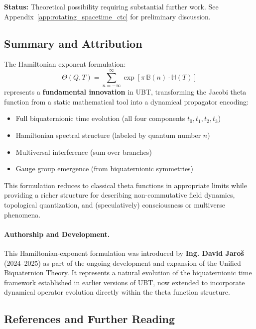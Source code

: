 \textbf{Status:} Theoretical possibility requiring substantial further work. See Appendix~\ref{app:rotating_spacetime_ctc} for preliminary discussion.

\subsection{Summary and Attribution}

The Hamiltonian exponent formulation:
\begin{equation}
\Theta(Q, T) = \sum_{n=-\infty}^{\infty} \exp\!\left[\pi\,\mathbb{B}(n) \cdot \mathbb{H}(T)\right]
\end{equation}
represents a \textbf{fundamental innovation} in UBT, transforming the Jacobi theta function from a static mathematical tool into a dynamical propagator encoding:
\begin{itemize}
\item Full biquaternionic time evolution (all four components $t_0, t_1, t_2, t_3$)
\item Hamiltonian spectral structure (labeled by quantum number $n$)
\item Multiversal interference (sum over branches)
\item Gauge group emergence (from biquaternionic symmetries)
\end{itemize}

This formulation reduces to classical theta functions in appropriate limits while providing a richer structure for describing non-commutative field dynamics, topological quantization, and (speculatively) consciousness or multiverse phenomena.

\paragraph{Authorship and Development.}

This Hamiltonian-exponent formulation was introduced by \textbf{Ing. David Jaroš} (2024--2025) as part of the ongoing development and expansion of the Unified Biquaternion Theory. It represents a natural evolution of the biquaternionic time framework established in earlier versions of UBT, now extended to incorporate dynamical operator evolution directly within the theta function structure.

\subsection{References and Further Reading}

